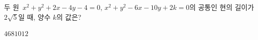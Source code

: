 두 원~$x^2+y^2+2x-4y-4=0$, $x^2+y^2-6x-10y+2k=0$의 공통인 현의 길이가 $2\sqrt{5}$일 때, 양수 $k$의 값은?
\begin{choices32}{$4$}{$6$}{$8$}{$10$}{$12$}\end{choices32}
